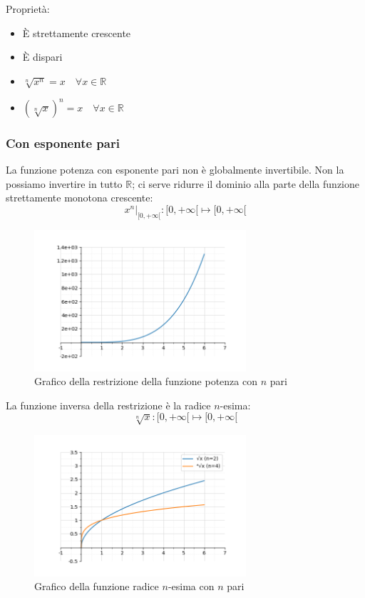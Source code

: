 Proprietà:
\begin{itemize}
\item È strettamente crescente
\item È dispari
\item $\sqrt[n]{x^n} = x \quad \forall x \in \mathbb{R}$
\item $(\sqrt[n]{x})^n = x \quad \forall x \in \mathbb{R}$
\end{itemize}

\subsubsection{Con esponente pari}
La funzione potenza con esponente pari non è globalmente invertibile. Non la possiamo invertire in tutto $\mathbb{R}$; ci serve ridurre il dominio alla parte della funzione strettamente monotona crescente:
$$x^n|_{[0, +\infty[}: [0,+\infty[ \mapsto [0, +\infty[ $$

\begin{figure}[H]
    \centering
    \includegraphics[width=0.7\textwidth]{./img/esponente_pari_ristretta.png}
    \caption{Grafico della restrizione della funzione potenza con $n$ pari}
    \label{fig:potenza_pari_ristretta}
\end{figure}
\FloatBarrier

La funzione inversa della restrizione è la radice $n$-esima:
$$\sqrt[n]{x}: [0, +\infty[ \mapsto [0, +\infty[ $$

\begin{figure}[H]
    \centering
    \includegraphics[width=0.7\textwidth]{./img/radice_pari.png}
    \caption{Grafico della funzione radice $n$-esima con $n$ pari}
    \label{fig:radice_pari}
\end{figure}
\FloatBarrier

